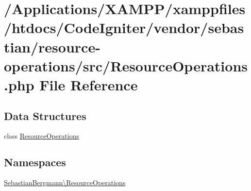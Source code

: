 \hypertarget{_resource_operations_8php}{}\section{/\+Applications/\+X\+A\+M\+P\+P/xamppfiles/htdocs/\+Code\+Igniter/vendor/sebastian/resource-\/operations/src/\+Resource\+Operations.php File Reference}
\label{_resource_operations_8php}
\subsection*{Data Structures}
\begin{DoxyCompactItemize}
\item 
class \mbox{\hyperlink{class_sebastian_bergmann_1_1_resource_operations_1_1_resource_operations}{Resource\+Operations}}
\end{DoxyCompactItemize}
\subsection*{Namespaces}
\begin{DoxyCompactItemize}
\item 
 \mbox{\hyperlink{namespace_sebastian_bergmann_1_1_resource_operations}{Sebastian\+Bergmann\textbackslash{}\+Resource\+Operations}}
\end{DoxyCompactItemize}
